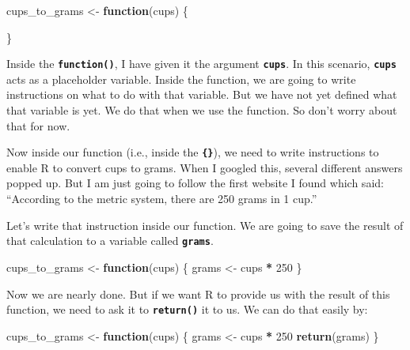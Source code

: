 \documentclass[
]{book}
\newenvironment{Shaded}{\begin{snugshade}}{\end{snugshade}}
\newcommand{\ControlFlowTok}[1]{\textcolor[rgb]{0.13,0.29,0.53}{\textbf{#1}}}
\newcommand{\DecValTok}[1]{\textcolor[rgb]{0.00,0.00,0.81}{#1}}
\newcommand{\FunctionTok}[1]{\textcolor[rgb]{0.13,0.29,0.53}{\textbf{#1}}}
\newcommand{\NormalTok}[1]{#1}
\newcommand{\OtherTok}[1]{\textcolor[rgb]{0.56,0.35,0.01}{#1}}
\newcommand{\SpecialCharTok}[1]{\textcolor[rgb]{0.81,0.36,0.00}{\textbf{#1}}}
\begin{document}
\begin{Shaded}
\begin{Highlighting}[]
\NormalTok{cups\_to\_grams }\OtherTok{\textless{}{-}} \ControlFlowTok{function}\NormalTok{(cups) \{}
  
\NormalTok{\}}
\end{Highlighting}
\end{Shaded}

Inside the \textbf{\texttt{function()}}, I have given it the argument \textbf{\texttt{cups}}. In this scenario, \textbf{\texttt{cups}} acts as a placeholder variable. Inside the function, we are going to write instructions on what to do with that variable. But we have not yet defined what that variable is yet. We do that when we use the function. So don't worry about that for now.

Now inside our function (i.e., inside the \textbf{\texttt{\{\}}}), we need to write instructions to enable R to convert cups to grams. When I googled this, several different answers popped up. But I am just going to follow the first website I found which said: ``According to the metric system, there are 250 grams in 1 cup.''

Let's write that instruction inside our function. We are going to save the result of that calculation to a variable called \textbf{\texttt{grams}}.

\begin{Shaded}
\begin{Highlighting}[]
\NormalTok{cups\_to\_grams }\OtherTok{\textless{}{-}} \ControlFlowTok{function}\NormalTok{(cups) \{}
\NormalTok{  grams }\OtherTok{\textless{}{-}}\NormalTok{ cups }\SpecialCharTok{*} \DecValTok{250}
\NormalTok{\}}
\end{Highlighting}
\end{Shaded}

Now we are nearly done. But if we want R to provide us with the result of this function, we need to ask it to \textbf{\texttt{return()}} it to us. We can do that easily by:

\begin{Shaded}
\begin{Highlighting}[]
\NormalTok{cups\_to\_grams }\OtherTok{\textless{}{-}} \ControlFlowTok{function}\NormalTok{(cups) \{}
\NormalTok{  grams }\OtherTok{\textless{}{-}}\NormalTok{ cups }\SpecialCharTok{*} \DecValTok{250}
  \FunctionTok{return}\NormalTok{(grams)}
\NormalTok{\}}
\end{Highlighting}
\end{Shaded}
\end{document}
